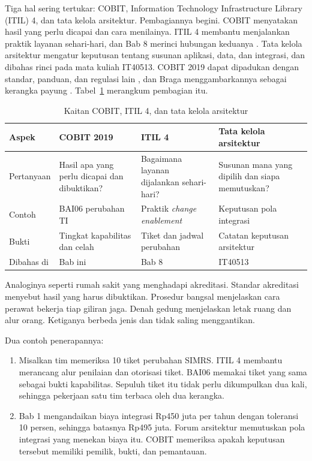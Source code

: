 Tiga hal sering tertukar: COBIT, Information Technology Infrastructure Library (ITIL) 4, dan tata kelola arsitektur. Pembagiannya begini. COBIT menyatakan hasil yang perlu dicapai
dan cara menilainya. ITIL 4 membantu menjalankan praktik layanan sehari-hari, dan Bab 8 merinci hubungan keduanya \cite{itil4}. Tata kelola arsitektur mengatur keputusan
tentang susunan aplikasi, data, dan integrasi, dan dibahas rinci pada mata kuliah IT40513. COBIT 2019 dapat dipadukan dengan standar, panduan, dan regulasi lain
\cite{c04-perbandingan}, dan Braga menggambarkannya sebagai kerangka payung \cite{c04-prinsip}. Tabel~\ref{tab:ch04-kaitan} merangkum pembagian itu.

\begin{table}[!htb]
  \centering\small
  \caption{Kaitan COBIT, ITIL 4, dan tata kelola arsitektur}\label{tab:ch04-kaitan}
  \begin{tabularx}{\textwidth}{|>{\raggedright\arraybackslash}p{}|>{\raggedright\arraybackslash}X|>{\raggedright\arraybackslash}X|>{\raggedright\arraybackslash}X|}
    \hline
    \textbf{Aspek} & \textbf{COBIT 2019} & \textbf{ITIL 4} & \textbf{Tata kelola arsitektur} \\ \hline
    Pertanyaan & Hasil apa yang perlu dicapai dan dibuktikan? & Bagaimana layanan dijalankan sehari-hari? & Susunan mana yang dipilih dan siapa memutuskan? \\ \hline
    Contoh & BAI06 perubahan TI & Praktik \textit{change enablement} & Keputusan pola integrasi \\ \hline
    Bukti & Tingkat kapabilitas dan celah & Tiket dan jadwal perubahan & Catatan keputusan arsitektur \\ \hline
    Dibahas di & Bab ini & Bab 8 & IT40513 \\ \hline
  \end{tabularx}
\end{table}

Analoginya seperti rumah sakit yang menghadapi akreditasi. Standar akreditasi menyebut hasil yang harus dibuktikan. Prosedur bangsal menjelaskan cara perawat bekerja tiap
giliran jaga. Denah gedung menjelaskan letak ruang dan alur orang. Ketiganya berbeda jenis dan tidak saling menggantikan.

Dua contoh penerapannya:
\begin{enumerate}
  \item Misalkan tim memeriksa 10 tiket perubahan SIMRS. ITIL 4 membantu merancang alur penilaian dan otorisasi tiket. BAI06 memakai tiket yang sama sebagai bukti kapabilitas.
  Sepuluh tiket itu tidak perlu dikumpulkan dua kali, sehingga pekerjaan satu tim terbaca oleh dua kerangka.
  \item Bab 1 mengandaikan biaya integrasi Rp450 juta per tahun dengan toleransi 10 persen, sehingga batasnya Rp495 juta. Forum arsitektur memutuskan pola integrasi yang
  menekan biaya itu. COBIT memeriksa apakah keputusan tersebut memiliki pemilik, bukti, dan pemantauan.
\end{enumerate}

